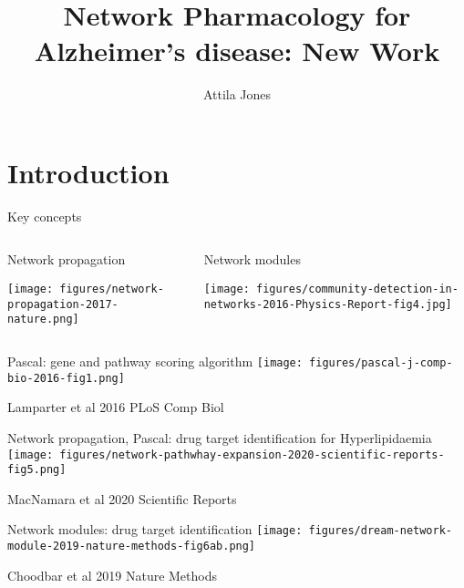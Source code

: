 \documentclass[aspectratio=169]{beamer}
\title{Network Pharmacology for Alzheimer's disease: New Work}
\subtitle{}
\author{Attila Jones}
\date{}
\begin{document}
\titlepage

\section{Introduction}

\begin{frame}{Key concepts}
\begin{columns}[t]
\begin{column}{0.6\textwidth}
\begin{center}
  Network propagation

\texttt{[image: figures/network-propagation-2017-nature.png]}
\end{center}
\end{column}

\begin{column}{0.4\textwidth}
\begin{center}
  Network modules

\texttt{[image: figures/community-detection-in-networks-2016-Physics-Report-fig4.jpg]}
\end{center}
\end{column}
\end{columns}
\end{frame}

\begin{frame}[label=pascal]{Pascal: gene and pathway scoring algorithm}
\texttt{[image: figures/pascal-j-comp-bio-2016-fig1.png]}

{\tiny Lamparter et al 2016 PLoS Comp Biol}
\end{frame}


\begin{frame}{Network propagation, Pascal: drug target identification for Hyperlipidaemia}
\texttt{[image: figures/network-pathwhay-expansion-2020-scientific-reports-fig5.png]}

{\tiny MacNamara et al 2020 Scientific Reports}
\end{frame}

\begin{frame}{Network modules: drug target identification}
  \texttt{[image: figures/dream-network-module-2019-nature-methods-fig6ab.png]}

{\tiny Choodbar et al 2019 Nature Methods}
\end{frame}
\end{document}
